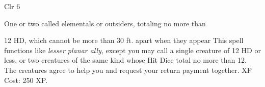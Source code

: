 
\begin{description*}
\item[Level:] Clr 6
\item[Effect:] One or two called elementals or outsiders, totaling no more than
\end{description*}

12 HD, which cannot be more than 30 ft. apart when they appear
This spell functions like \textit{lesser planar ally}, except you may call a single
creature of 12 HD or less, or two creatures of the same kind whose Hit Dice total
no more than 12. The creatures agree to help you and request your return payment
together.
XP Cost: 250 XP.